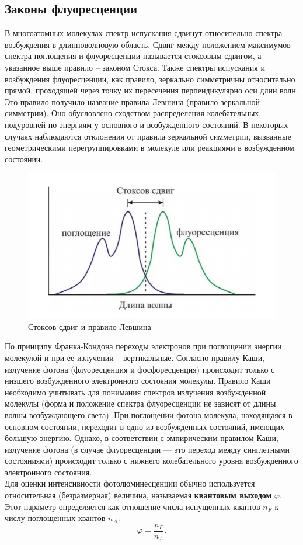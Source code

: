 \documentclass[a4paper,12pt]{article}
\renewcommand{\phi}{\ensuremath{\varphi}} %
\renewcommand{\phi}{\ensuremath{\varphi}}
\begin{document}
\subsection*{Законы флуоресценции}
В многоатомных молекулах спектр испускания сдвинут относительно спектра
возбуждения в длинноволновую область. Сдвиг между
положением максимумов спектра поглощения и флуоресценции называется стоксовым
сдвигом, а указанное выше правило – законом Стокса. 
Также спектры испускания и возбуждения флуоресценции, как правило, зеркально
симметричны относительно прямой, проходящей через точку их пересечения
перпендикулярно оси длин волн. Это правило получило название правила Левшина
(правило зеркальной симметрии). Оно обусловлено сходством распределения колебательных
подуровней по энергиям у основного и возбужденного состояний. В некоторых случаях
наблюдаются отклонения от правила зеркальной симметрии, вызванные геометрическими
перегруппировками в молекуле или реакциями в возбужденном состоянии. 
\begin{figure}
    \centering
    \includegraphics[scale=0.9]{stoks.jpg}
    \caption{Стоксов сдвиг и правило Левшина}
\end{figure}

По принципу Франка-Кондона переходы электронов при поглощении энергии молекулой и при ее
излучении – вертикальные. Согласно правилу Каши, излучение фотона (флуоресценция и
фосфоресценция) происходит только с низшего возбужденного электронного состояния
молекулы. Правило Каши необходимо учитывать для понимания спектров излучения
возбужденной молекулы (форма и положение спектра флуоресценции не зависят от длины
волны возбуждающего света). При поглощении фотона молекула, находящаяся в основном
состоянии, переходит в одно из возбужденных состояний, имеющих большую энергию. Однако, в соответствии с эмпирическим правилом Каши, излучение фотона (в
случае флуоресценции — это переход между синглетными состояниями) происходит
только с нижнего колебательного уровня возбужденного электронного состояния.
\\
Для оценки интенсивности фотолюминесценции обычно используется относительная
(безразмерная) величина, называемая \textbf{квантовым выходом} $\phi$. Этот параметр определяется
как отношение числа испущенных квантов $n_F$ к числу поглощенных квантов $n_A$:
\begin{equation}
    \phi = \frac{n_F}{n_A}.
\end{equation}
\end{document}
